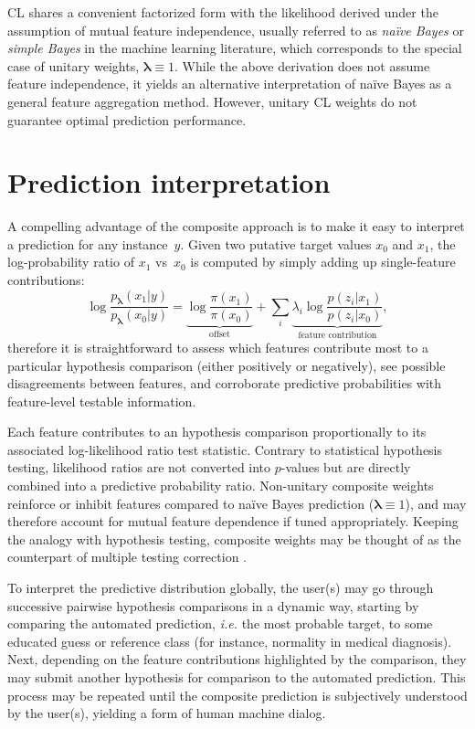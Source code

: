 \documentclass[english]{scrartcl}
\newcommand{\lda}{{\boldsymbol{\lambda}}}
\begin{document}
CL shares a convenient factorized form with the likelihood derived under the assumption of mutual feature independence, usually referred to as {\em na\"ive Bayes} or {\em simple Bayes} in the machine learning literature, which corresponds to the special case of unitary weights, $\lda\equiv 1$. While the above derivation does not assume feature independence, it yields an alternative interpretation of na\"ive Bayes as a general feature aggregation method. However, unitary CL weights do not guarantee optimal prediction performance.


\section{Prediction interpretation}

A compelling advantage of the composite approach is to make it easy to interpret a prediction for any instance~$y$. Given two putative target values $x_0$ and $x_1$, the log-probability ratio of $x_1$ vs~$x_0$ is computed by simply adding up single-feature contributions: 
$$
\log \frac{p_\lda(x_1|y)}{p_\lda(x_0|y)}
= 
\underbrace{\log \frac{\pi(x_1)}{\pi(x_0)}}_{\text{offset}}
+ \sum_i \underbrace{\lambda_i \log \frac{p(z_i|x_1)}{p(z_i|x_0)}}_{\text{feature contribution}},
$$
therefore it is straightforward to assess which features contribute most to a particular hypothesis comparison (either positively or negatively), see possible disagreements between features, and corroborate predictive probabilities with feature-level testable information. 

Each feature contributes to an hypothesis comparison proportionally to its associated log-likelihood ratio test statistic. Contrary to statistical hypothesis testing, likelihood ratios are not converted into $p$-values but are directly combined into a predictive probability ratio. Non-unitary composite weights reinforce or inhibit features compared to na\"ive Bayes prediction ($\lda\equiv 1$), and may therefore account for mutual feature dependence if tuned appropriately. Keeping the analogy with hypothesis testing, composite weights may be thought of as the counterpart of multiple testing correction \cite{Benjamini-10}.

To interpret the predictive distribution globally, the user(s) may go through successive pairwise hypothesis comparisons in a dynamic way, starting by comparing the automated prediction, {\em i.e.} the most probable target, to some educated guess or reference class (for instance, normality in medical diagnosis). Next, depending on the feature contributions highlighted by the comparison, they may submit another hypothesis for comparison to the automated prediction. This process may be repeated until the composite prediction is subjectively understood by the user(s), yielding a form of human machine dialog.
\end{document}
